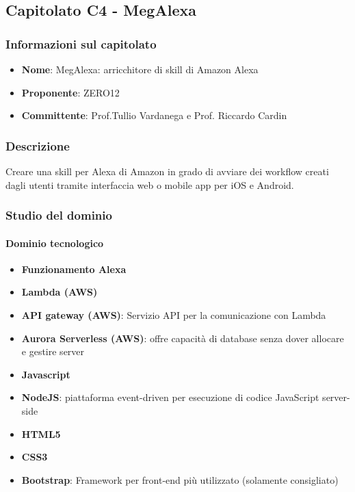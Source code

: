 \subsection{Capitolato C4 - MegAlexa}
\subsubsection{Informazioni sul capitolato}
\begin{itemize}
    \item \textbf{Nome}: MegAlexa: arricchitore di skill di Amazon Alexa
	\item \textbf{Proponente}: ZERO12
	\item \textbf{Committente}: Prof.Tullio Vardanega e Prof. Riccardo Cardin
\end{itemize}
\subsubsection{Descrizione}
Creare una skill per Alexa di Amazon in grado di avviare dei workflow creati dagli utenti tramite interfaccia web o
mobile app per iOS e Android.
\subsubsection{Studio del dominio}
\paragraph{Dominio tecnologico}\mbox{}
\begin{itemize}
    \item \textbf{Funzionamento Alexa}
    \item \textbf{Lambda (AWS)}
    \item \textbf{API gateway (AWS)}: Servizio API per la comunicazione con Lambda
    \item \textbf{Aurora Serverless (AWS)}: offre capacità di database senza dover allocare e gestire server
    \item \textbf{Javascript}
    \item \textbf{NodeJS}: piattaforma event-driven per esecuzione di codice JavaScript server-side
    \item \textbf{HTML5}
    \item \textbf{CSS3}
    \item \textbf{Bootstrap}: Framework per front-end più utilizzato (solamente consigliato)
\end{itemize}
